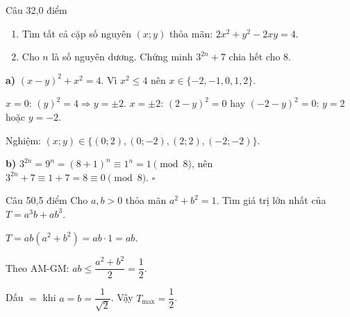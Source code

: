 \begin{de_cau}{Câu 3}{2,0 điểm}
\begin{enumerate}[label=\alph*)]
  \item Tìm tất cả cặp số nguyên $(x;y)$ thỏa mãn: $2x^2 + y^2 - 2xy = 4$.
  \item Cho $n$ là số nguyên dương. Chứng minh $3^{2n}+7$ chia hết cho $8$.
\end{enumerate}
\end{de_cau}

\begin{loi_giai_cau}
\textbf{a)} $(x-y)^2+x^2=4$. Vì $x^2\le4$ nên $x\in\{-2,-1,0,1,2\}$.

$x=0$: $(y)^2=4\Rightarrow y=\pm2$. $x=\pm2$: $(2-y)^2=0$ hay $(-2-y)^2=0$: $y=2$ hoặc $y=-2$.

Nghiệm: $(x;y)\in\{(0;2),(0;-2),(2;2),(-2;-2)\}$.

\textbf{b)} $3^{2n}=9^n=(8+1)^n\equiv1^n=1\pmod{8}$, nên $3^{2n}+7\equiv1+7=8\equiv0\pmod{8}$. $\square$
\end{loi_giai_cau}

\begin{de_cau}{Câu 5}{0,5 điểm}
Cho $a, b > 0$ thỏa mãn $a^2 + b^2 = 1$. Tìm giá trị lớn nhất của $T = a^3b + ab^3$.
\end{de_cau}

\begin{loi_giai_cau}
$T=ab(a^2+b^2)=ab\cdot1=ab$.

Theo AM-GM: $ab\le\dfrac{a^2+b^2}{2}=\dfrac{1}{2}$.

Dấu $=$ khi $a=b=\dfrac{1}{\sqrt{2}}$. Vậy $T_{\max}=\boxed{\dfrac{1}{2}}$.
\end{loi_giai_cau}
